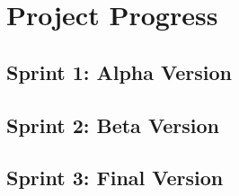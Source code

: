 \chapter{Project Progress\label{ch:project_progress}}


\section{Sprint 1: Alpha Version}


\section{Sprint 2: Beta Version}


\section{Sprint 3: Final Version}